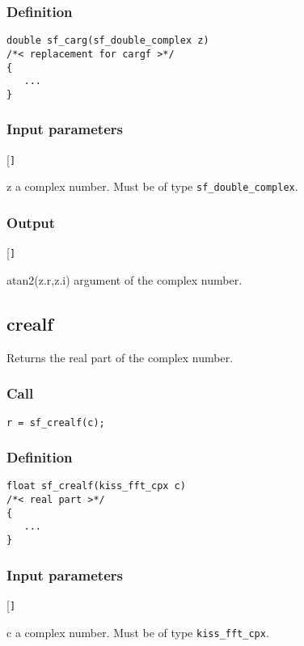 \subsubsection*{Definition}
\begin{verbatim}
double sf_carg(sf_double_complex z)
/*< replacement for cargf >*/
{
   ...
}
\end{verbatim}

\subsubsection*{Input parameters}
\begin{desclist}{\tt }{\quad}[\tt ]
   \setlength\itemsep{0pt}
   \item[z] a complex number. Must be of type \texttt{sf\_double\_complex}.  
\end{desclist}

\subsubsection*{Output}
\begin{desclist}{\tt }{\quad}[\tt ]
   \setlength\itemsep{0pt}
   \item[atan2(z.r,z.i)] argument of the complex number. 
\end{desclist}




\subsection{{crealf}}
Returns the real part of the complex number.

\subsubsection*{Call}
\begin{verbatim}r = sf_crealf(c);\end{verbatim}

\subsubsection*{Definition}
\begin{verbatim}
float sf_crealf(kiss_fft_cpx c)
/*< real part >*/
{
   ...
}
\end{verbatim}

\subsubsection*{Input parameters}
\begin{desclist}{\tt }{\quad}[\tt ]
   \setlength\itemsep{0pt}
   \item[c] a complex number. Must be of type \texttt{kiss\_fft\_cpx}.
\end{desclist}

